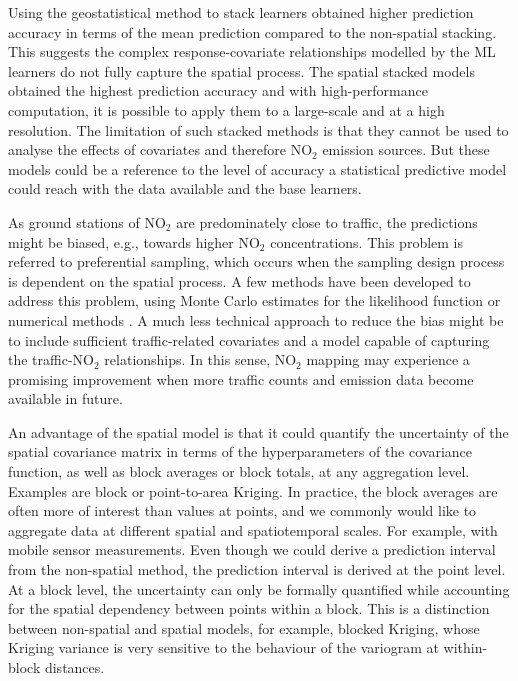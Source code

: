 \documentclass{article}
\begin{document}
Using the geostatistical method to stack learners obtained higher prediction accuracy in terms of the mean prediction compared to the non-spatial stacking. This suggests the complex response-covariate relationships modelled by the ML learners do not fully capture the spatial process. The  spatial stacked models obtained the highest prediction accuracy and with high-performance computation, it is possible to apply them to a large-scale and at a high resolution. The limitation of such stacked methods is that they cannot be used to analyse the effects of covariates and therefore NO$_2$ emission sources. But these models could be a reference to the level of accuracy a statistical predictive model could reach with the data available and the base learners.%

As ground stations of NO$_2$ are predominately close to traffic, the predictions might be biased, e.g., towards higher NO$_2$ concentrations. This problem is referred to preferential sampling, which occurs when the sampling design process is dependent on the spatial process. A few methods have been developed to address this problem, using Monte Carlo estimates for the likelihood function \citep{diggle2010geostatistical} or numerical methods \citep{dinsdale2019methods}. %
A much less technical approach to reduce the bias might be to include sufficient traffic-related covariates and a model capable of capturing the traffic-NO$_2$ relationships. In this sense, NO$_2$ mapping may experience a promising improvement when more traffic counts and emission data become available in future.  

An advantage of the spatial model is that it could quantify the uncertainty of the spatial covariance matrix in terms of the hyperparameters of the covariance function, as well as block averages or block totals, at any aggregation level. Examples are block or point-to-area Kriging. In practice, the block averages are often more of interest than values at points, and we commonly would like to aggregate data at different spatial and spatiotemporal scales. For example, with mobile sensor measurements. Even though we could derive a prediction interval from the non-spatial method, the prediction interval is derived at the point level. At a block level, the uncertainty can only be formally quantified while accounting for the spatial dependency between points within a block. This is a distinction between non-spatial and spatial models, for example, blocked Kriging, whose Kriging variance is very sensitive to the behaviour of the variogram at within-block distances. 
\end{document}
